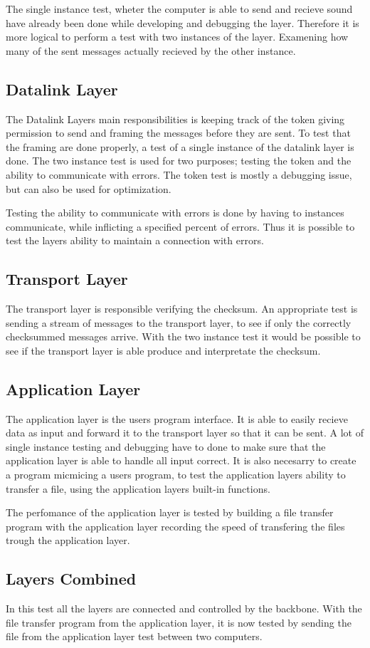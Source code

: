 The single instance test, wheter the computer is able to send and recieve sound have already been done while developing and debugging the layer. Therefore it is more logical to perform a test with two instances of the layer. Examening how many of the sent messages actually recieved by the other instance.

\subsection{Datalink Layer}


The Datalink Layers main responsibilities is keeping track of the token giving permission to send and framing the messages before they are sent.
To test that the framing are done properly, a test of a single instance of the datalink layer is done. The two instance test is used for two purposes; testing the token and the ability to communicate with errors. The token test is mostly a debugging issue, but can also be used for optimization.

Testing the ability to communicate with errors is done by having to instances communicate, while inflicting a specified percent of errors. Thus it is possible to test the layers ability to maintain a connection with errors.


\subsection{Transport Layer}

The transport layer is responsible verifying the checksum. An appropriate test is sending a stream of messages to the transport layer, to see if only the correctly checksummed messages arrive. With the two instance test it would be possible to see if the transport layer is able produce and interpretate the checksum.

\subsection{Application Layer}

The application layer is the users program interface. It is able to easily recieve data as input and forward it to the transport layer so that it can be sent. A lot of single instance testing and debugging have to done to make sure that the application layer is able to handle all input correct. It is also necesarry to create a program micmicing a users program, to test the application layers ability to transfer a file, using the application layers built-in functions. 

The perfomance of the application layer is tested by building a file transfer program with the application layer recording the speed of transfering the files trough the application layer.

\subsection{Layers Combined}

In this test all the layers are connected and controlled by the backbone. With the file transfer program from the application layer, it is now tested by sending the file from the application layer test between two computers. 

